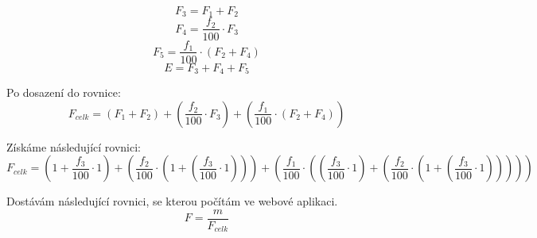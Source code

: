 \begin{equation}
    \label{eqn:3_calculation_7_1}
    F_3 = F_1 + F_2
\end{equation}
\begin{equation}
    \label{eqn:4_calculation_7_1}
    F_4 = \frac{f_2}{100} \cdot F_3
\end{equation}
\begin{equation}
    \label{eqn:5_calculation_7_1}
    F_5 = \frac{f_1}{100} \cdot (F_2 + F_4)
\end{equation}
\begin{equation}
    \label{eqn:6_calculation_7_1}
    E = F_3 + F_4 + F_5
\end{equation}

\noindent Po dosazení do rovnice:
\begin{equation}
    \label{eqn:7_calculation_7_1}
    F_{celk} = (F_1 + F_2) + (\frac{f_2}{100} \cdot F_3) + (\frac{f_1}{100} \cdot (F_2 + F_4))
\end{equation}

\noindent Získáme následující rovnici:
\begin{equation}
    \label{eqn:8_calculation_7_1}
    F_{celk} = (1 + \frac{f_3}{100} \cdot 1) + (\frac{f_2}{100} \cdot (1 + (\frac{f_3}{100} \cdot 1))) + (\frac{f_1}{100} \cdot ((\frac{f_3}{100} \cdot 1) + (\frac{f_2}{100} \cdot (1 + (\frac{f_3}{100} \cdot 1)))))
\end{equation}

\noindent Dostávám následující rovnici, se kterou počítám ve webové aplikaci.
\begin{equation}
    \label{eqn:9_calculation_7_1}
    F = \frac{m}{F_{celk}}
\end{equation}


